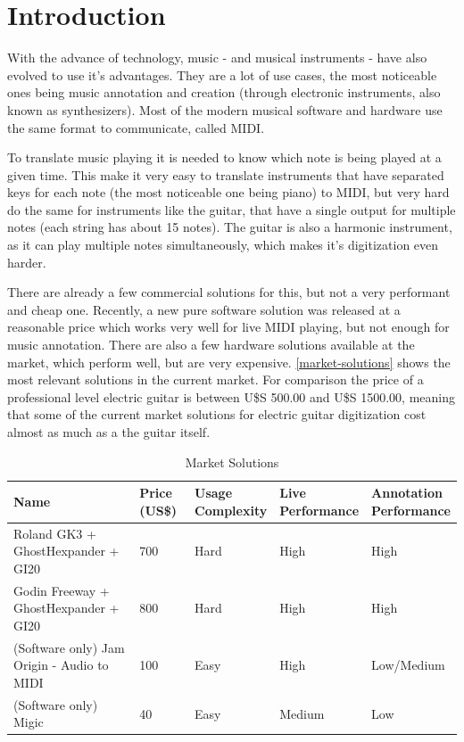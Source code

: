 \chapter[Introduction]{Introduction}
With the advance of technology, music - and musical instruments - have also evolved to
use it's advantages. They are a lot of use cases, the most noticeable ones being music
annotation and creation (through electronic instruments, also known as synthesizers).
Most of the modern musical software and hardware use the same format to communicate,
called MIDI.

To translate music playing it is needed to know which note is being played at a
given time. This make it very easy to translate instruments that have separated
keys for each note (the most noticeable one being piano) to MIDI, but very hard
do the same for instruments like the guitar, that have a single output for multiple
notes (each string has about 15 notes). The guitar is also a harmonic instrument,
as it can play multiple notes simultaneously, which makes it's digitization even harder.

There are already a few commercial solutions for this, but not a very performant
and cheap one. Recently, a new pure software solution was released at a reasonable
price which works very well for live MIDI playing, but not enough for music annotation.
There are also a few hardware solutions available at the market, which perform well,
but are very expensive. \autoref{market-solutions} shows the most relevant solutions
in the current market. For comparison the price of a professional level electric guitar is
between U\$S 500.00 and U\$S 1500.00, meaning that some of the current market solutions
for electric guitar digitization cost almost as much as a the guitar itself.

\begin{table}[htb]
  \begin{center}
    \ABNTEXreducedfont
    \caption[Market Solutions]{Market Solutions}
    \label{market-solutions}
    \begin{tabular}{m{4 cm} | m{1 cm} | m{2 cm} | m{2 cm} | m{2 cm} }
      \hline
      Name & Price (US\$) & \pbox{2 cm}{Usage\\Complexity} & \pbox{2 cm}{Live\\Performance} & \pbox{2 cm}{Annotation\\Performance}\\
      \hline \hline
      Roland GK3 + GhostHexpander + GI20 & 700 & Hard & High & High \\
      Godin Freeway + GhostHexpander + GI20 & 800 & Hard & High & High \\
      (Software only) Jam Origin - Audio to MIDI & 100 & Easy & High & Low/Medium \\
      (Software only) Migic & 40 & Easy & Medium & Low \\
      \hline
    \end{tabular}
  \end{center}
\end{table}

